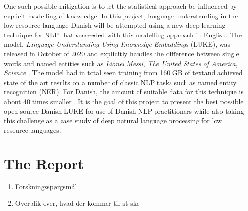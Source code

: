 \documentclass[main.tex]{subfiles}
\begin{document}
One such possible mitigation is to let the statistical approach be influenced by explicit modelling of knowledge.
In this project, language understanding in the low resource language Danish will be attempted using a new deep learning technique for NLP that succeeded with this modelling approach in English.
The model, \emph{Language Understanding Using Knowledge Embeddings} (LUKE), was released in October of 2020 and explicitly handles the difference between single words and named entities such as \emph{Lionel Messi}, \emph{The United States of America}, \emph{Science} \cite{yamada2020luke}.
The model had in total seen training from 160 GB of text\footnotemark and achieved state of the art results on a number of classic NLP tasks such as named entity recognition (NER).
For Danish, the amount of suitable data for this technique is about 40 times smaller \footnotemark.
It is the goal of this project to present the best possible open source Danish LUKE for use of Danish NLP practitioners while also taking this challenge as a case study of deep natural language processing for low resource languages.

\section{The Report}%
\label{sec:The Report}
\begin{enumerate}
    \item Forskningsspørgsmål
    \item Overblik over, hvad der kommer til at ske
\end{enumerate}
\end{document}
